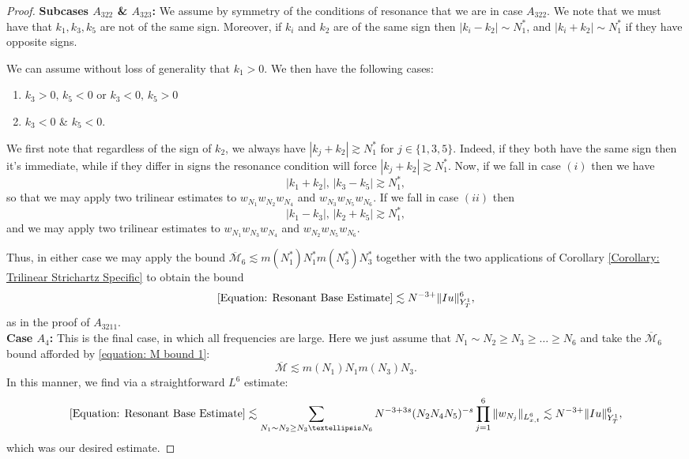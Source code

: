 \documentclass[10pt,a4paper]{amsart}
\begin{document}
\begin{proof}
    \textbf{Subcases $A_{322}$ \& $A_{323}$: }We assume by symmetry of the conditions of resonance that we are in case $A_{322}$. We note that we must have that $k_1,k_3,k_5$ are not of the same sign. Moreover, if $k_i$ and $k_2$ are of the same sign then $|k_i-k_2|\sim N_1^*$, and $|k_i+k_2|\sim N_{1}^*$ if they have opposite signs. 
    
    We can assume without loss of generality that $k_1 > 0$. We then have the following cases:
    \begin{enumerate}[label = (\roman*)]
        \item $k_3 > 0,\,k_5 < 0$ or $k_3 < 0,\,k_5 > 0$
        \item $k_3 < 0$ \& $k_5 < 0$.
    \end{enumerate}
    We first note that regardless of the sign of $k_2$, we always have $|k_j+k_2|\gtrsim N_1^*$ for $j\in\{1,3,5\}$. Indeed, if they both have the same sign then it's immediate, while if they differ in signs the resonance condition will force $|k_j+k_2|\gtrsim N_1^*$. Now, if we fall in case $(i)$ then we have
    \[
    |k_1+k_2|,\,|k_3-k_5|\gtrsim N_1^*,
    \]
    so that we may apply two trilinear estimates to $w_{N_1}w_{N_2}w_{N_4}$ and $w_{N_3}w_{N_5}w_{N_6}$. If we fall in case $(ii)$ then
    \[
    |k_1-k_3|,\,|k_2+k_5|\gtrsim N_1^*,
    \]
    and we may apply two trilinear estimates to $w_{N_1}w_{N_3}w_{N_4}$ and $w_{N_2}w_{N_5}w_{N_6}$.

    Thus, in either case we may apply the bound $\overline{\mathcal{M}}_6\lesssim m(N_1^*)N_1^*m(N_3^*)N_3^*$ together with the two applications of Corollary \ref{Corollary: Trilinear Strichartz Specific} to obtain the bound
    \[
\eqref{Equation: Resonant Base Estimate}\lesssim N^{-3+}\|Iu\|_{Y^1_T}^6,
    \]
    as in the proof of $A_{3211}$.\\
    \textbf{Case $A_4$:} This is the final case, in which all frequencies are large. Here we just assume that $N_1\sim N_2\geq N_3\geq \dots\geq N_6$ and take the $\overline{\mathcal{M}}_6$ bound afforded by \eqref{equation: M bound 1}:
    \[
    \overline{\mathcal{M}}\lesssim m(N_1)N_1m(N_3)N_3.
    \]
    In this manner, we find via a straightforward $L^6$ estimate:
    \[
        \eqref{Equation: Resonant Base Estimate}\lesssim \sum_{N_1\sim N_2\geq N_3\dots N_6}N^{-3+3s}(N_2N_4N_5)^{-s}\prod_{j=1}^6\|w_{N_j}\|_{L^6_{x,t}}\lesssim N^{-3+}\|Iu\|_{Y^1_T}^6,
    \]
    which was our desired estimate.
\end{proof}
\end{document}
